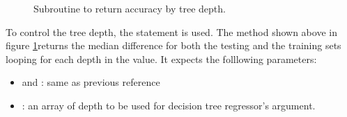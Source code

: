 \begin{figure}[H]
	\centering
	\caption{Subroutine to return accuracy by tree depth.}
	\label{fig:abt}
\end{figure}
To control the tree depth, the statement  is used. The method  shown above in figure \ref{fig:abt}returns the median difference for both the testing and the training sets looping for each depth in the  value. It expects the folllowing parameters:
\begin{itemize}
	\item {} and : same as previous reference
	\item {}: an array of depth to be used for decision tree regressor's  argument.
\end{itemize}

